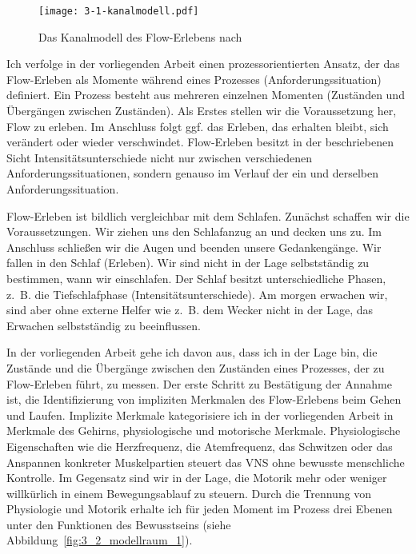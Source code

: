 \begin{figure}[t]
	\centering
		\texttt{[image: 3-1-kanalmodell.pdf]}
	\caption[Das Kanalmodell des Flow-Erlebens]{Das Kanalmodell des Flow-Erlebens nach \citet[S.~75]{Csikszentmihalyi2010}}
	\label{fig:3_1_kanalmodell}
\end{figure}

Ich verfolge in der vorliegenden Arbeit einen prozessorientierten Ansatz, der das Flow-Erleben als Momente während eines Prozesses (Anforderungssituation) definiert. Ein Prozess besteht aus mehreren einzelnen Momenten (Zuständen und Übergängen zwischen Zuständen). Als Erstes stellen wir die Voraussetzung her, Flow zu erleben. Im Anschluss folgt ggf. das Erleben, das erhalten bleibt, sich verändert oder wieder verschwindet. Flow-Erleben besitzt in der beschriebenen Sicht Intensitätsunterschiede nicht nur zwischen verschiedenen Anforderungssituationen, sondern genauso im Verlauf der ein und derselben Anforderungssituation.

Flow-Erleben ist bildlich vergleichbar mit dem Schlafen. Zunächst schaffen wir die Voraussetzungen. Wir ziehen uns den Schlafanzug an und decken uns zu. Im Anschluss schließen wir die Augen und beenden unsere Gedankengänge. Wir fallen in den Schlaf (Erleben). Wir sind nicht in der Lage selbstständig zu bestimmen, wann wir einschlafen. Der Schlaf besitzt unterschiedliche Phasen, z.~B. die Tiefschlafphase (Intensitätsunterschiede). Am morgen erwachen wir, sind aber ohne externe Helfer wie z.~B. dem Wecker nicht in der Lage, das Erwachen selbstständig zu beeinflussen.

In der vorliegenden Arbeit gehe ich davon aus, dass ich in der Lage bin, die Zustände und die Übergänge zwischen den Zuständen eines Prozesses, der zu Flow-Erleben führt, zu messen. Der erste Schritt zu Bestätigung der Annahme ist, die Identifizierung von impliziten Merkmalen des Flow-Erlebens beim Gehen und Laufen. Implizite Merkmale kategorisiere ich in der vorliegenden Arbeit in Merkmale des Gehirns, physiologische und motorische Merkmale. Physiologische Eigenschaften wie die Herzfrequenz, die Atemfrequenz, das Schwitzen oder das Anspannen konkreter Muskelpartien steuert das \ac{VNS} ohne bewusste menschliche Kontrolle. Im Gegensatz sind wir in der Lage, die Motorik mehr oder weniger willkürlich in einem Bewegungsablauf zu steuern. Durch die Trennung von Physiologie und Motorik erhalte ich für jeden Moment im Prozess drei Ebenen unter den Funktionen des Bewusstseins (siehe Abbildung~\ref{fig:3_2_modellraum_1}).

